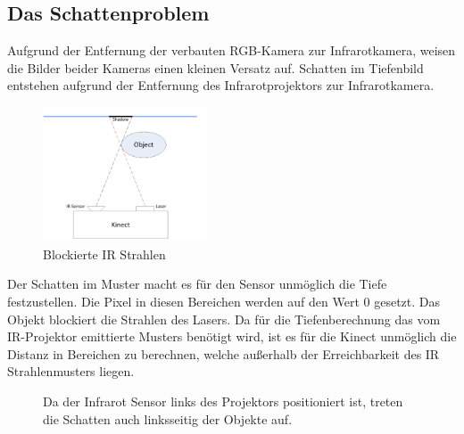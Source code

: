 \subsection{Das Schattenproblem}

Aufgrund der Entfernung der verbauten RGB-Kamera zur Infrarotkamera, weisen die Bilder beider Kameras einen kleinen Versatz auf.
Schatten im Tiefenbild entstehen aufgrund der Entfernung des Infrarotprojektors zur Infrarotkamera.
\begin{figure}
  \vspace{-20pt}
  \begin{center}
       \includegraphics[height=4cm]{Res/Schatten_Strahl.png}
  \end{center}
  \vspace{-20pt}
  \caption{Blockierte IR Strahlen }
  \vspace{-10pt}
\end{figure}
Der Schatten im Muster macht es für den Sensor unmöglich die Tiefe festzustellen. Die Pixel in diesen Bereichen werden auf den Wert 0 gesetzt.
Das Objekt blockiert die Strahlen des Lasers. Da für die Tiefenberechnung das vom IR-Projektor emittierte Musters benötigt wird, ist es für die Kinect unmöglich die Distanz in Bereichen zu berechnen, welche außerhalb der Erreichbarkeit des IR Strahlenmusters liegen. \\








\begin{figure}[!ht]
  \centering
   \caption{Da der Infrarot Sensor links des Projektors positioniert ist, treten die Schatten auch linksseitig der Objekte auf.  }
\end{figure}




